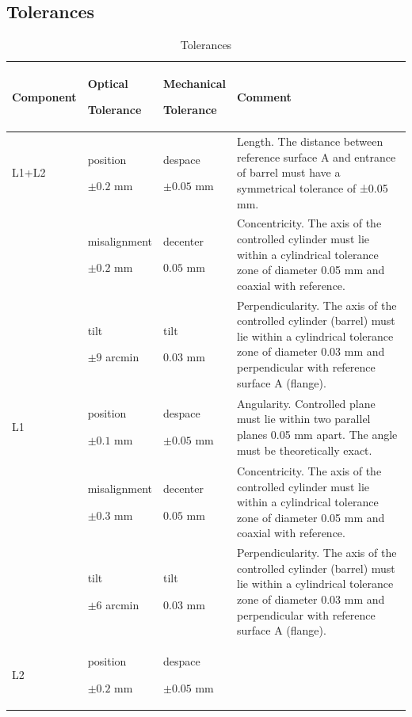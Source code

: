 \documentclass{article}
\begin{document}
\subsection{Tolerances}

\begin{table}
\caption{Tolerances}
\label{table:tolerances}
\begin{center}
\small
\begin{tabular}{lp{2cm}p{2cm}p{6cm}}
\hline
\hline
Component&Optical\par Tolerance&Mechanical\par Tolerance&Comment\\
\hline
L1+L2	
&position\par$\pm0.2$ mm &despace\par$\pm0.05$ mm&
Length. The distance between reference surface A and entrance of barrel must have a symmetrical tolerance of ±0.05 mm.\\
&misalignment\par$\pm0.2$ mm&decenter\par$0.05$ mm&							
Concentricity. The axis of the controlled cylinder must lie within a cylindrical tolerance zone of diameter 0.05 mm and coaxial with reference.\\
&tilt\par$\pm9$ arcmin&tilt\par$0.03$ mm&
Perpendicularity. The axis of the controlled cylinder (barrel) must lie within a cylindrical tolerance zone of diameter 0.03 mm and perpendicular with reference surface A (flange).\\
\hline
L1
&position\par$\pm0.1$ mm&despace\par$\pm0.05$ mm&
Angularity. Controlled plane must lie within two parallel planes 0.05 mm apart. The angle must be theoretically exact.\\	
&misalignment\par$\pm0.3$ mm&decenter\par$0.05$ mm&
Concentricity. The axis of the controlled cylinder must lie within a cylindrical tolerance zone of diameter 0.05 mm and coaxial with reference.\\
&tilt\par$\pm6$ arcmin&tilt\par0.03 mm&Perpendicularity. The axis of the controlled cylinder (barrel) must lie within a cylindrical tolerance zone of diameter 0.03 mm and perpendicular with reference surface A (flange).\\
\hline
L2
&position\par$\pm0.2$ mm&despace\par$\pm 0.05$ mm&

\end{tabular}
\end{center}
\end{table}
\end{document}
